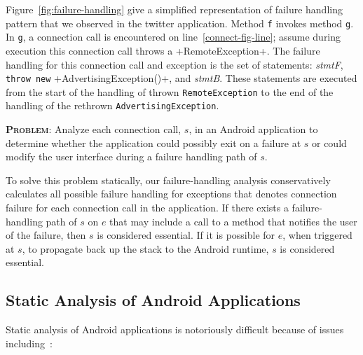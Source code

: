 Figure~\ref{fig:failure-handling} give a simplified representation of
failure handling pattern that we observed in the twitter application.
Method \lstinline!f! invokes method \lstinline!g!.  In \lstinline!g!,
a connection call is encountered on line~\ref{connect-fig-line};
assume during execution this connection call throws a
+RemoteException+.  The failure handling for this
connection call and exception is the set of statements:
{\it stmtF}, \lstinline!throw new! +AdvertisingException()+,
and {\it stmtB}.  These statements are executed from the start of the
handling of thrown \lstinline!RemoteException! to the end of the
handling of the rethrown \lstinline!AdvertisingException!.

\begin{description}[leftmargin=0cm,listparindent=0pt,itemindent=0cm]
\item \textsc{\bfseries{Problem}}: Analyze each connection call,
$s$, in an Android application to determine whether the application
could possibly exit on a failure at $s$ or could modify the user
interface during a failure handling path of $s$.
\end{description}

To solve this problem statically, our failure-handling analysis
conservatively calculates all possible failure handling for exceptions
that denotes connection failure for each connection call in the
application.  If there exists a failure-handling path of $s$ on $e$
that may include a call to a method that notifies the user of the
failure, then $s$ is considered essential.  If it is possible for $e$,
when triggered at $s$, to propagate back up the stack to the Android
runtime, $s$ is considered essential.

\subsection{Static Analysis of Android Applications}

Static analysis of Android
applications is notoriously difficult because of issues
including~\cite{Gordon:Kim:Perkins:Gilham:Nguyen:Rinard:NDSS15}:

